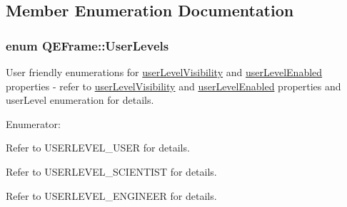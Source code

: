 \subsection{Member Enumeration Documentation}
\hypertarget{classQEFrame_a7f512f888a2a6f46631a382597090503}{
\subsubsection[{UserLevels}]{\setlength{\rightskip}{0pt plus 5cm}enum {\bf QEFrame::UserLevels}}}
\label{classQEFrame_a7f512f888a2a6f46631a382597090503}
User friendly enumerations for \hyperlink{classQEFrame_af6b93bbb318228dd8debf550d8e35bd0}{userLevelVisibility} and \hyperlink{classQEFrame_af3d7163c6158e457d081c5de695bd064}{userLevelEnabled} properties -\/ refer to \hyperlink{classQEFrame_af6b93bbb318228dd8debf550d8e35bd0}{userLevelVisibility} and \hyperlink{classQEFrame_af3d7163c6158e457d081c5de695bd064}{userLevelEnabled} properties and userLevel enumeration for details. \begin{Desc}
\item[Enumerator: ]\par
\begin{description}
\item[{\em 
\hypertarget{classQEFrame_a7f512f888a2a6f46631a382597090503ae8ace5cdce21b461961fe91d9e866e08}{
User}
\label{classQEFrame_a7f512f888a2a6f46631a382597090503ae8ace5cdce21b461961fe91d9e866e08}
}]Refer to USERLEVEL\_\-USER for details. \item[{\em 
\hypertarget{classQEFrame_a7f512f888a2a6f46631a382597090503a9c26f1c5e07f37944ee8995df369486f}{
Scientist}
\label{classQEFrame_a7f512f888a2a6f46631a382597090503a9c26f1c5e07f37944ee8995df369486f}
}]Refer to USERLEVEL\_\-SCIENTIST for details. \item[{\em 
\hypertarget{classQEFrame_a7f512f888a2a6f46631a382597090503ac51282f02e7904d94e142f51c92e3a33}{
Engineer}
\label{classQEFrame_a7f512f888a2a6f46631a382597090503ac51282f02e7904d94e142f51c92e3a33}
}]Refer to USERLEVEL\_\-ENGINEER for details. \end{description}
\end{Desc}




